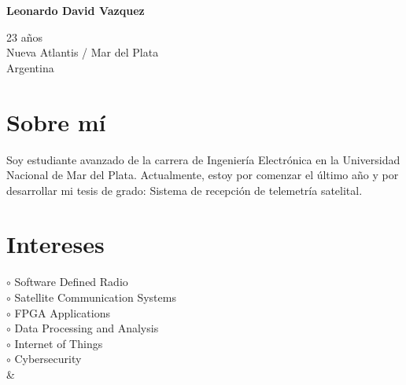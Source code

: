 \documentclass[a4paper,10pt]{article}
\begin{document}
\thispagestyle{empty}

\begin{adjustbox}{valign=t}
\begin{minipage}{0.34\textwidth} 
\begin{center}
\MySkip 	%
{\LARGE \bfseries Leonardo David Vazquez}
\MySkip 	%
\end{center}
23 años\\
Nueva Atlantis / Mar del Plata \\
Argentina

\textcolor{ColorRed}{\faEnvelopeO} 

\textcolor{ColorRed}{\faLinkedin} 

\textcolor{ColorRed}{\faGithub} 

\section*{Sobre mí}
\raggedright
Soy estudiante avanzado de la carrera de Ingeniería Electrónica en la Universidad Nacional de Mar del Plata. Actualmente, estoy por comenzar el último año y por desarrollar mi tesis de grado: Sistema de recepción de telemetría satelital.
\section*{Intereses}
\raggedright
\textcolor{ColorOne}{$\circ$} Software Defined Radio\\
\textcolor{ColorOne}{$\circ$} Satellite Communication Systems\\
\textcolor{ColorOne}{$\circ$} FPGA Applications\\
\textcolor{ColorOne}{$\circ$} Data Processing and Analysis\\
\textcolor{ColorOne}{$\circ$} Internet of Things\\
\textcolor{ColorOne}{$\circ$} Cybersecurity\\
&\vfill

\end{minipage}
\end{adjustbox}
\end{document}

